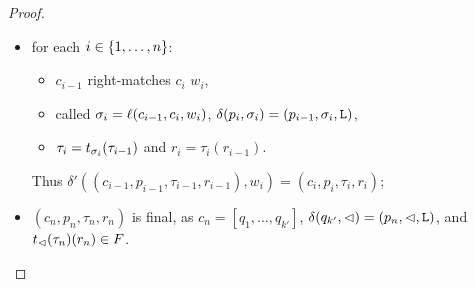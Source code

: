 \begin{proof}
\begin{itemize}
		\item for each $i\in\{1,\dots,n\}$:
		      \begin{itemize}
			      \item $c_{i-1}$ right-matches $c_i$ \wrt $w_i$,
			      \item called $\sigma_i=\ell(c_{i-1},c_i,w_i)$, $\delta(p_i,\sigma_i)=(p_{i-1},\sigma_i,\mathtt L)$,
			      \item $\tau_i=t_{\sigma_i}(\tau_{i-1})$ and $r_i=\tau_i(r_{i-1})$.
		      \end{itemize}
		      Thus $\delta'((c_{i-1},p_{i-1},\tau_{i-1},r_{i-1}),w_i)=(c_i,p_i,\tau_i,r_i)$;
		\item $(c_n,p_n,\tau_n,r_n)$ is final, as $c_n=[q_1,\dots,q_{k'}]$, $\delta(q_{k'},\lhd)=(p_n,\lhd,\mathtt L)$, and $t_\lhd(\tau_n)(r_n)\in F$. \qedhere
	\end{itemize}
\end{proof}

